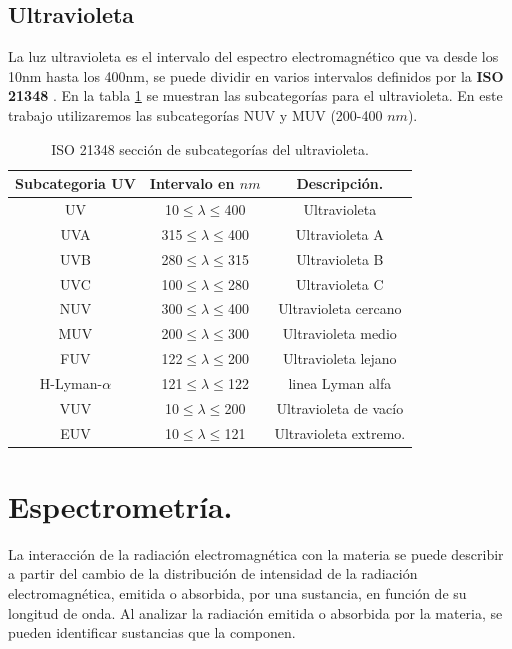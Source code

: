 \subsection{Ultravioleta}
La luz ultravioleta es el intervalo del espectro electromagnético que va desde los 10nm hasta los 400nm, se puede dividir en varios intervalos definidos por la \textbf{ISO 21348} \cite{Solar}. En la tabla \ref{tabla:UV} se muestran las subcategorías para el ultravioleta. En este trabajo utilizaremos las subcategorías NUV y MUV (200-400 $nm$). 
\begin{table}
	\centering
	\caption{ISO 21348 sección de subcategorías del ultravioleta. \cite{Solar}} 
	\label{tabla:UV}
	\begin{tabular}{|c c c|}
		\hline
		Subcategoria UV & Intervalo en \textbf{$nm$} & Descripción. \\
		\hline
		UV & 10$\leq\lambda\leq$400 & Ultravioleta \\
		\hline
		\hline
		UVA & 315$\leq\lambda\leq$400 & Ultravioleta A\\
		UVB & 280$\leq\lambda\leq$315 & Ultravioleta B\\
		UVC & 100$\leq\lambda\leq$280 & Ultravioleta C\\
		\hline
		\hline
		NUV & 300$\leq\lambda\leq$400 & Ultravioleta cercano\\
		MUV & 200$\leq\lambda\leq$300 & Ultravioleta medio\\
		FUV & 122$\leq\lambda\leq$200 & Ultravioleta lejano\\
		H-Lyman-$\alpha$ & 121$\leq\lambda\leq$122 &  linea Lyman alfa\\
		\hline\hline
		VUV & 10$\leq\lambda\leq$200 & Ultravioleta de vacío\\
		EUV & 10$\leq\lambda\leq$121 & Ultravioleta extremo.\\
		\hline
	\end{tabular}
\end{table}

\section{Espectrometría.}
La interacción de la radiación electromagnética con la materia se puede describir a partir del cambio de la distribución de intensidad de la radiación electromagnética, emitida o absorbida, por una sustancia, en función de su longitud de onda. Al analizar la radiación emitida o absorbida por la materia, se pueden identificar sustancias que la componen. 


